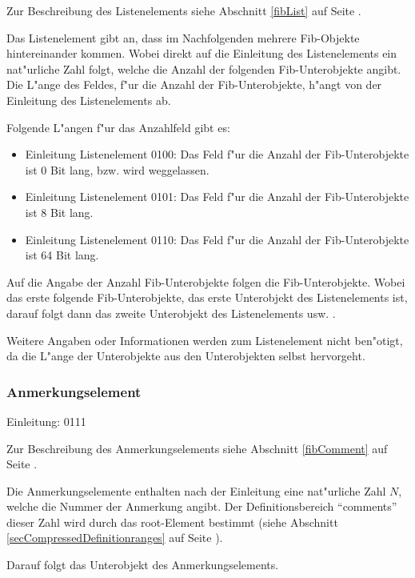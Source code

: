 \bigskip\noindent
Zur Beschreibung des Listenelements siehe Abschnitt \ref{fibList} auf Seite \pageref{fibList} .

Das Listenelement gibt an, dass im Nachfolgenden mehrere Fib-Objekte hintereinander kommen. Wobei direkt auf die Einleitung des Listenelements ein nat"urliche Zahl folgt, welche die Anzahl der folgenden Fib-Unterobjekte angibt. Die L"ange des Feldes, f"ur die Anzahl der Fib-Unterobjekte, h"angt von der Einleitung des Listenelements ab.

\bigskip\noindent
Folgende L"angen f"ur das Anzahlfeld gibt es:
\begin{itemize}
 \item Einleitung Listenelement 0100: Das Feld f"ur die Anzahl der Fib-Unterobjekte ist 0 Bit lang, bzw. wird weggelassen.
 \item Einleitung Listenelement 0101: Das Feld f"ur die Anzahl der Fib-Unterobjekte ist 8 Bit lang.
 \item Einleitung Listenelement 0110: Das Feld f"ur die Anzahl der Fib-Unterobjekte ist 64 Bit lang.
\end{itemize}

Auf die Angabe der Anzahl Fib-Unterobjekte folgen die Fib-Unterobjekte. Wobei das erste folgende Fib-Unterobjekte, das erste Unterobjekt des Listenelements ist, darauf folgt dann das zweite Unterobjekt des Listenelements usw. .

Weitere Angaben oder Informationen werden zum Listenelement nicht ben"otigt, da die L"ange der Unterobjekte aus den Unterobjekten selbst hervorgeht.


\subsubsection{Anmerkungselement}
\label{secCompressedComments}

Einleitung: 0111

\bigskip\noindent
Zur Beschreibung des Anmerkungselements siehe Abschnitt \ref{fibComment} auf Seite \pageref{fibComment} .

Die Anmerkungselemente enthalten nach der Einleitung eine nat"urliche Zahl $N$, welche die Nummer der Anmerkung angibt. Der Definitionsbereich ``comments'' dieser Zahl wird durch das root-Element bestimmt (siehe Abschnitt \ref{secCompressedDefinitionranges} auf Seite \pageref{secCompressedDefinitionranges}).

Darauf folgt das Unterobjekt des Anmerkungselements.

